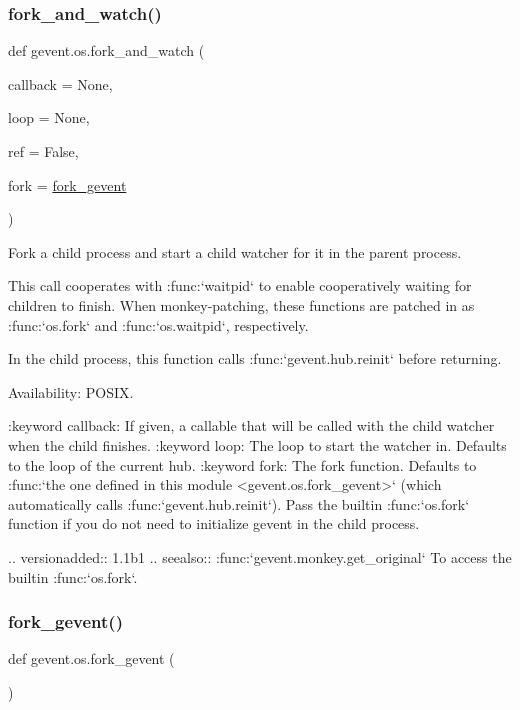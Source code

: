 \subsubsection{\texorpdfstring{fork\+\_\+and\+\_\+watch()}{fork\_and\_watch()}}
{\footnotesize\ttfamily def gevent.\+os.\+fork\+\_\+and\+\_\+watch (\begin{DoxyParamCaption}\item[{}]{callback = {\ttfamily None},  }\item[{}]{loop = {\ttfamily None},  }\item[{}]{ref = {\ttfamily False},  }\item[{}]{fork = {\ttfamily \hyperlink{namespacegevent_1_1os_a98835fac37df4bd17a1433f6c01daf6f}{fork\+\_\+gevent}} }\end{DoxyParamCaption})}

\begin{DoxyVerb}Fork a child process and start a child watcher for it in the parent process.

This call cooperates with :func:`waitpid` to enable cooperatively waiting
for children to finish. When monkey-patching, these functions are patched in as
:func:`os.fork` and :func:`os.waitpid`, respectively.

In the child process, this function calls :func:`gevent.hub.reinit` before returning.

Availability: POSIX.

:keyword callback: If given, a callable that will be called with the child watcher
    when the child finishes.
:keyword loop: The loop to start the watcher in. Defaults to the
    loop of the current hub.
:keyword fork: The fork function. Defaults to :func:`the one defined in this
    module <gevent.os.fork_gevent>` (which automatically calls :func:`gevent.hub.reinit`).
    Pass the builtin :func:`os.fork` function if you do not need to
    initialize gevent in the child process.

.. versionadded:: 1.1b1
.. seealso::
    :func:`gevent.monkey.get_original` To access the builtin :func:`os.fork`.
\end{DoxyVerb}
 \mbox{\label{namespacegevent_1_1os_a98835fac37df4bd17a1433f6c01daf6f}} 
\subsubsection{\texorpdfstring{fork\+\_\+gevent()}{fork\_gevent()}}
{\footnotesize\ttfamily def gevent.\+os.\+fork\+\_\+gevent (\begin{DoxyParamCaption}{ }\end{DoxyParamCaption})}

